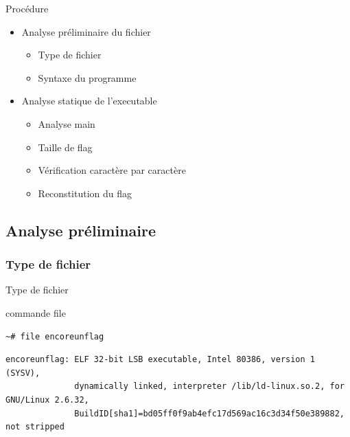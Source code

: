 \documentclass[10pt,sans,usenames,dvipsnames,french,compress]{beamer}
\begin{document}
\begin{frame}{Procédure}
	\begin{itemize}
		\item Analyse préliminaire du fichier
		
			\begin{itemize}
				\item Type de fichier
				\item Syntaxe du programme
			\end{itemize}
		
		\item Analyse statique de l'executable
		
			\begin{itemize}
				
				\item Analyse main
				\item Taille de flag
				\item Vérification caractère par caractère
				\item Reconstitution du flag
			\end{itemize}
		
	\end{itemize}
\end{frame}

\subsection{Analyse préliminaire}
\subsubsection{Type de fichier}
\begin{frame}[fragile]{Type de fichier}
	\begin{block}{commande file}
		\vspace{-3mm}
		\begin{lstlisting}[style=Term]
			~# file encoreunflag
		\end{lstlisting}
		\vspace{-2mm}
	\end{block}
	\begin{block}{}
		\vspace{-3mm}
		\begin{lstlisting}[style=Term]
		      encoreunflag: ELF 32-bit LSB executable, Intel 80386, version 1 (SYSV), 
		      dynamically linked, interpreter /lib/ld-linux.so.2, for GNU/Linux 2.6.32,
		      BuildID[sha1]=bd05ff0f9ab4efc17d569ac16c3d34f50e389882, not stripped

		\end{lstlisting}
		\vspace{-2mm}
	\end{block}
\end{frame}	
\end{document}
